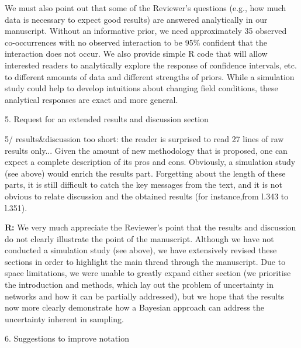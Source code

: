 \documentclass[12pt]{letter}
\newenvironment{refquote}{\bigskip \begin{it}}{\end{it}\smallskip}
\begin{document}
		We must also point out that some of the Reviewer's questions (e.g., how much data is necessary to expect good results) are answered analytically in our manuscript. Without an informative prior, we need approximately 35 observed co-occurrences with no observed interaction to be 95\% confident that the interaction does not occur. We also provide simple R code that will allow interested readers to analytically explore the response of confidence intervals, etc. to different amounts of data and different strengths of priors. While a simulation study could help to develop intuitions about changing field conditions, these analytical responses are exact and more general.


	5. Request for an extended results and discussion section


		\begin{refquote}
			5/ results\&discussion too short: the reader is surprised to read 27 lines of raw results only... Given the amount of new methodology that is proposed, one can expect a complete description of its pros and cons. Obviously, a simulation study (see above) would enrich the results part. Forgetting about the length of these parts, it is still difficult to catch the key messages from the text, and it is not obvious to relate discussion and the obtained results (for instance,from l.343 to l.351).
		\end{refquote}


		\textbf{R:} We very much appreciate the Reviewer's point that the results and discussion do not clearly illustrate the point of the manuscript. Although we have not conducted a simulation study (see above), we have extensively revised these sections in order to highlight the main thread through the manuscript. Due to space limitations, we were unable to greatly expand either section (we prioritise the introduction and methods, which lay out the problem of uncertainty in networks and how it can be partially addressed), but we hope that the results now more clearly demonstrate how a Bayesian approach can address the uncertainty inherent in sampling.


	6. Suggestions to improve notation 
\end{document}
